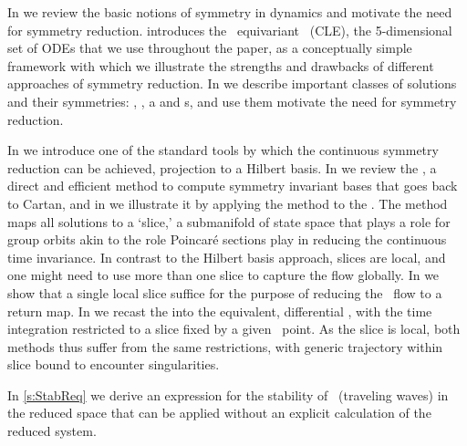 In  we review the basic notions of symmetry
in dynamics and motivate the need for symmetry reduction.
 introduces the \ equivariant
\cLe\ (CLE), the 5-dimensional set of ODEs that we use
throughout the paper, as a conceptually  simple framework
with which we illustrate the strengths and drawbacks of different
approaches of symmetry reduction.
In  we describe important classes of
solutions and their symmetries: \eqva, \reqva, \po a and \rpo s,
and use them motivate the need for symmetry reduction.

In  we introduce one of the standard tools
by which the continuous symmetry reduction can be achieved,
projection to a Hilbert basis.
In  we review the {\mframes}, a direct and
efficient method to compute symmetry invariant bases that
goes back to Cartan, and in  we
illustrate it by applying the method to the \cLe. The method
maps all solutions to a `slice,' a submanifold  of state
space that plays a role for group orbits akin to the role
Poincar\'e sections play in reducing the continuous time
invariance. In contrast to the Hilbert basis approach, slices
are local, and one might need to use more than one slice to
capture the flow globally. In  we show
that a single local slice suffice for the purpose of reducing
the \cLe\ flow to a return map.
In  we recast the {\mframes}
into the equivalent, differential \mslices, with the
time integration
restricted to a slice fixed by a given \statesp\ point.
As the slice is local, both methods thus suffer from the same
restrictions, with generic trajectory within slice bound to encounter
singularities.

In \ref{s:StabReq} we derive an expression for the stability
of \reqva\ (traveling waves) in the reduced space
that can be applied without an explicit
calculation of the reduced system.
